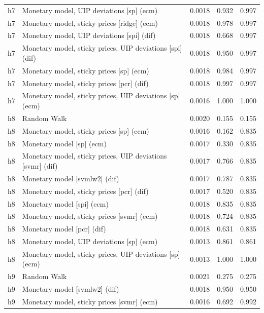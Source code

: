 \begin{ThreePartTable}
\begin{longtable}[t]{cp{5.5cm}ccc}
h7 & \raggedright Monetary model, UIP deviations [sp] (ecm) & 0.0018 & 0.932 & 0.997\\
h7 & \raggedright Monetary model, sticky prices [ridge] (ecm) & 0.0018 & 0.978 & 0.997\\
h7 & \raggedright Monetary model, UIP deviations [spi] (dif) & 0.0018 & 0.668 & 0.997\\
h7 & \raggedright Monetary model, sticky prices, UIP deviations [spi] (dif) & 0.0018 & 0.950 & 0.997\\
h7 & \raggedright Monetary model, sticky prices [sp] (ecm) & 0.0018 & 0.984 & 0.997\\
h7 & \raggedright Monetary model, sticky prices [pcr] (dif) & 0.0018 & 0.997 & 0.997\\
h7 & \raggedright Monetary model, sticky prices, UIP deviations [sp] (ecm) & 0.0016 & 1.000 & 1.000\\
\addlinespace
h8 & \raggedright Random Walk & 0.0020 & 0.155 & 0.155\\
h8 & \raggedright Monetary model, sticky prices [sp] (ecm) & 0.0016 & 0.162 & 0.835\\
h8 & \raggedright Monetary model [sp] (ecm) & 0.0017 & 0.330 & 0.835\\
h8 & \raggedright Monetary model, sticky prices, UIP deviations [svmr] (dif) & 0.0017 & 0.766 & 0.835\\
h8 & \raggedright Monetary model [svmlw2] (dif) & 0.0017 & 0.787 & 0.835\\
h8 & \raggedright Monetary model, sticky prices [pcr] (dif) & 0.0017 & 0.520 & 0.835\\
h8 & \raggedright Monetary model [spi] (ecm) & 0.0018 & 0.835 & 0.835\\
h8 & \raggedright Monetary model, sticky prices [svmr] (ecm) & 0.0018 & 0.724 & 0.835\\
h8 & \raggedright Monetary model [pcr] (dif) & 0.0018 & 0.631 & 0.835\\
h8 & \raggedright Monetary model, UIP deviations [sp] (ecm) & 0.0013 & 0.861 & 0.861\\
h8 & \raggedright Monetary model, sticky prices, UIP deviations [sp] (ecm) & 0.0013 & 1.000 & 1.000\\
\addlinespace
h9 & \raggedright Random Walk & 0.0021 & 0.275 & 0.275\\
h9 & \raggedright Monetary model [svmlw2] (dif) & 0.0018 & 0.950 & 0.950\\
h9 & \raggedright Monetary model, sticky prices [svmr] (ecm) & 0.0016 & 0.692 & 0.992\\

\end{longtable}
\end{ThreePartTable}
